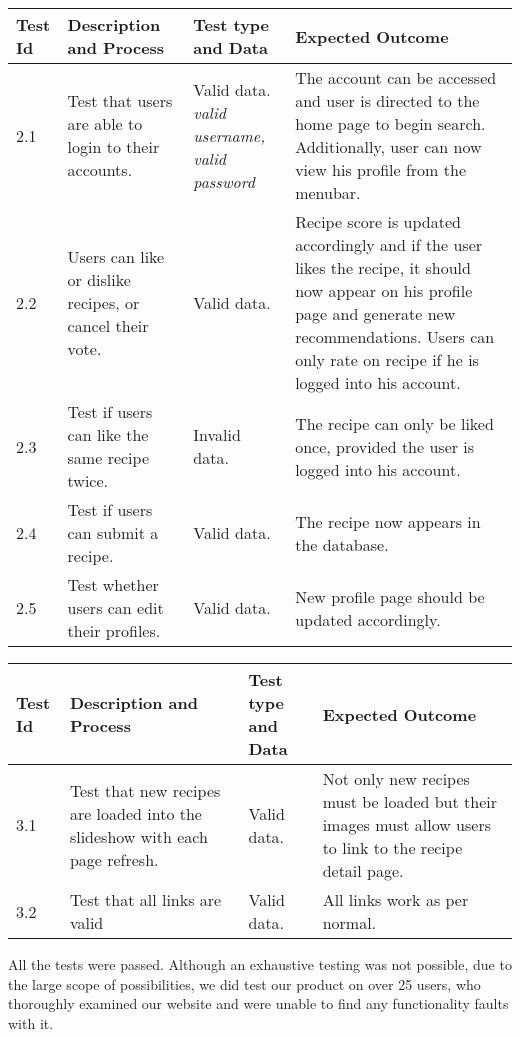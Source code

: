 		\begin{tabular}{ | l | p{4cm} |  p{4cm} | p{4cm} |}
    \hline
    Test Id	& Description and Process &	Test type and Data &	Expected Outcome \\ \hline

2.1	& Test that users are able to login to their accounts. &	Valid data. \emph { valid username, valid password}
&	The account can be accessed and user is directed to the home page to begin search. Additionally, user can now view his profile from the menubar.\\ \hline


2.2	& Users can like or dislike recipes, or cancel their vote. &	Valid data. &	Recipe score is updated accordingly and if the user likes the recipe, it should now appear on his profile page and generate new recommendations. Users can only rate on recipe if he is logged into his account.\\ \hline

2.3	& Test if users can like the same recipe twice. &	Invalid data. & The recipe can only be liked once, provided the user is logged into his account.\\ \hline

2.4	& Test if users can submit a recipe. &	Valid data. & The recipe now appears in the database.\\ \hline

2.5	& Test whether users can edit their profiles. & Valid data.&	New profile page should be updated accordingly.\\
		\hline
    \end{tabular}

		\begin{tabular}{ | l | p{4cm} |  p{4cm} | p{4cm} |}
    \hline
    Test Id	& Description and Process &	Test type and Data &	Expected Outcome \\ \hline
    
3.1	& Test that new recipes are loaded into the slideshow with each page refresh. &	Valid data.& Not only new recipes must be loaded but their images must allow users to link to the recipe detail page.\\ \hline

3.2	& Test that all links are valid &	Valid data. &	All links work as per normal.\\
		\hline
    \end{tabular}
    
All the tests were passed. Although an exhaustive testing was not possible, due to the large scope of possibilities, we did test our product on over 25 users, who thoroughly examined our website and were unable to find any functionality faults with it.

